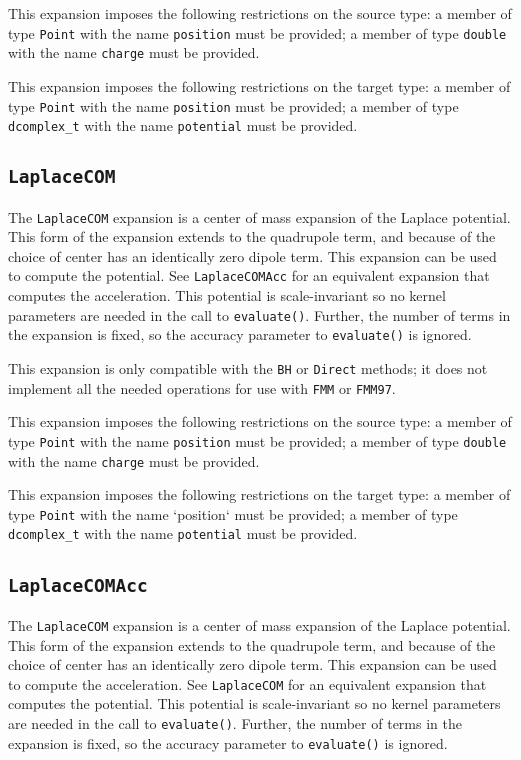This expansion imposes the following restrictions on the source type: a
member of type \texttt{Point} with the name \texttt{position} must be provided;
a member of
type \texttt{double} with the name \texttt{charge} must be provided.

This expansion imposes the following restrictions on the target type: a
member of type \texttt{Point} with the name \texttt{position} must be provided;
a member of type \texttt{dcomplex\_t} with the name \texttt{potential}
 must be provided.

\subsection{\texttt{LaplaceCOM}}

The \texttt{LaplaceCOM} expansion is a center of mass expansion of the Laplace
potential. This form of the expansion extends to the quadrupole term, and
because of the choice of center has an identically zero dipole term. This
expansion can be used to compute the potential. See \texttt{LaplaceCOMAcc} for an
equivalent expansion that computes the acceleration. This potential is
scale-invariant so no kernel parameters are needed in the call to
\texttt{evaluate()}.
Further, the number of terms in the expansion is fixed, so the accuracy
parameter to \texttt{evaluate()} is ignored.

This expansion is only compatible with the \texttt{BH} or \texttt{Direct}
methods; it does not implement all the needed operations for use with
\texttt{FMM} or \texttt{FMM97}.

This expansion imposes the following restrictions on the source type: a
member of type \texttt{Point} with the name \texttt{position} must be provided;
a member of type \texttt{double} with the name \texttt{charge} must be
provided.

This expansion imposes the following restrictions on the target type: a
member of type \texttt{Point} with the name `position` must be provided; a
member of type \texttt{dcomplex\_t} with the name \texttt{potential} must be
provided.

\subsection{\texttt{LaplaceCOMAcc}}

The \texttt{LaplaceCOM} expansion is a center of mass expansion of the Laplace
potential. This form of the expansion extends to the quadrupole term, and
because of the choice of center has an identically zero dipole term. This
expansion can be used to compute the acceleration. See \texttt{LaplaceCOM} for
an equivalent expansion that computes the potential. This potential is
scale-invariant so no kernel parameters are needed in the call to
\texttt{evaluate()}. Further, the number of terms in the expansion is fixed,
so the accuracy parameter to \texttt{evaluate()} is ignored.

